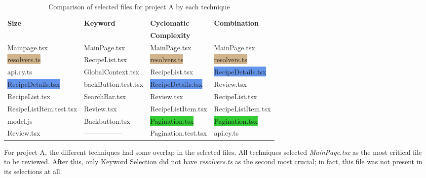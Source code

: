 \begin{table}[h!]
  \centering
  \fontsize{10}{10}\selectfont
  \caption{Comparison of selected files for project A by each technique}
  \label{tab:Selected_files_A}
  \begin{tabularx}{\textwidth}{llll}
    \hline
     \textbf{Size} & \textbf{Keyword} & \textbf{Cyclomatic } & \textbf{Combination} \\
     \textbf{} & \textbf{} & \textbf{Complexity } & \textbf{} \\ [1ex] \hline \hline 
    \colorbox{BurntOrange}{Mainpage.tsx} & \colorbox{BurntOrange}{MainPage.tsx} & \colorbox{BurntOrange}{MainPage.tsx} & \colorbox{BurntOrange}{MainPage.tsx} \\ [2ex]
    \colorbox{Tan}{resolvers.ts} & \colorbox{PineGreen}{RecipeList.tsx} & \colorbox{Tan}{resolvers.ts} & \colorbox{Tan}{resolvers.ts} \\ [2ex]
    \colorbox{WildStrawberry}{api.cy.ts} & GlobalContext.tsx & \colorbox{PineGreen}{RecipeList.tsx} & \colorbox{CornflowerBlue}{RecipeDetails.tsx} \\ [2ex]
    \colorbox{CornflowerBlue}{RecipeDetails.tsx} & backButton.test.tsx & \colorbox{CornflowerBlue}{RecipeDetails.tsx} & \colorbox{Rhodamine}{Review.tsx} \\ [2ex] 
    \colorbox{PineGreen}{RecipeList.tsx} & SearchBar.tsx & \colorbox{Rhodamine}{Review.tsx} & \colorbox{PineGreen}{RecipeList.tsx} \\ [2ex] 
    ResipeListItem.test.tsx & \colorbox{Rhodamine}{Review.tsx} & \colorbox{Mulberry}{RecipeListItem.tsx} & \colorbox{Mulberry}{RecipeListItem.tsx} \\ [2ex] 
    model.js & Backbutton.tsx & \colorbox{LimeGreen}{Pagination.tsx} & \colorbox{LimeGreen}{Pagination.tsx} \\ [2ex]
    \colorbox{Rhodamine}{Review.tsx} & ----------------- & Pagination.test.tsx & \colorbox{WildStrawberry}{api.cy.ts} \\ [2ex] 

  \end{tabularx}
\end{table}


For project A, the different techniques had some overlap in the selected files. All techniques selected \textit{MainPage.tsx} as the most critical file to be reviewed. After this, only Keyword Selection did not have \textit{resolvers.ts} as the second most crucial; in fact, this file was not present in its selections at all. \\

